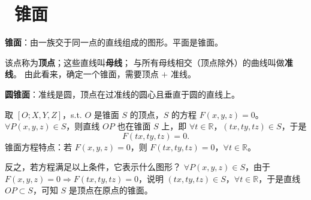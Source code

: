 \documentclass[UTF8,11pt]{ctexart}
\theoremstyle{cnthm}
\begin{document}
\section{\ 锥面}

\textbf{锥面}：由一族交于同一点的直线组成的图形。平面是锥面。

该点称为\textbf{顶点}；这些直线叫\textbf{母线}；
与所有母线相交（顶点除外）的曲线叫做\textbf{准线}。
由此看来，确定一个锥面，需要顶点 $+$ 准线。

\textbf{圆锥面}：准线是圆，顶点在过准线的圆心且垂直于圆的直线上。

取 $[O;X,Y,Z]$，s.t. $O$ 是锥面 $S$ 的顶点，$S$ 的方程
$F(x,y,z)=0$。$\forall P(x,y,z)\in S$，则直线 $OP$ 也在锥面
$S$ 上，即 $\forall t\in\mathbb R$，$(tx,ty,tz)\in S$，于是
\[
F(tx,ty,tz)=0 .
\]
锥面方程特点：若 $F(x,y,z)=0$，则
$F(tx,ty,tz)=0$，$\forall t\in\mathbb R$。

反之，若方程满足以上条件，它表示什么图形？
$\forall P(x,y,z)\in S$，由于 $F(x,y,z)=0
\Longrightarrow F(tx,ty,tz)=0$，说明
$(tx,ty,tz)\in S$，$\forall t\in\mathbb R$，于是直线
$OP\subset S$，可知 $S$ 是顶点在原点的锥面。
\end{document}
